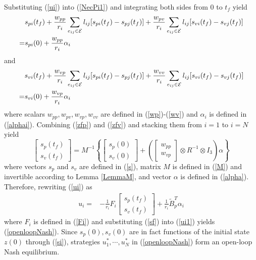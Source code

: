 \documentclass[letterpaper, 10 pt, conference,onecolumn]{ieeeconf}  %
\begin{document}
Substituting (\ref{ui}) into (\ref{NecPi1}) and integrating both sides from $0$ to $t_f$ yield
\begin{align}
&s_{pi}(t_f)+\frac{w_{pp}}{r_i}\sum_{e_{ij}\in\mathcal{E}} l_{ij}[s_{pi}(t_f)-s_{pj}(t_f)] +\frac{w_{pv}}{r_i}\sum_{e_{ij}\in\mathcal{E}} l_{ij}[s_{vi}(t_f)-s_{vj}(t_f)]\notag\\
=&s_{pi}(0)+\frac{w_{pp}}{r_i}\alpha_i
\label{zfp}
\end{align}
and
\begin{align}
&s_{vi}(t_f)+\frac{w_{vp}}{r_i}\sum_{e_{ij}\in\mathcal{E}} l_{ij}[s_{pi}(t_f)-s_{pj}(t_f)] +\frac{w_{vv}}{r_i}\sum_{e_{ij}\in\mathcal{E}} l_{ij}[s_{vi}(t_f)-s_{vj}(t_f)]\notag\\
=&s_{vi}(0)+\frac{w_{vp}}{r_i}\alpha_i
\label{zfv}
\end{align}
where scalars $w_{pp},w_{pv},w_{vp},w_{vv}$ are defined in (\ref{wp})-(\ref{wv}) and $\alpha_i$ is defined in (\ref{alphai}). Combining (\ref{zfp}) and (\ref{zfv}) and stacking them from $i=1$ to $i=N$ yield
\begin{equation}
\begin{bmatrix}
s_p(t_f)\\
s_v(t_f)
\end{bmatrix}=M^{-1}\left\{\begin{bmatrix}
s_p(0)\\
s_v(0)
\end{bmatrix}+\left(\begin{bmatrix}
w_{pp}\\
w_{vp}
\end{bmatrix}\otimes R^{-1}\otimes I_3\right)\alpha\right\}\label{sf}
\end{equation}
where vectors $s_p$ and $s_v$ are defined in (\ref{s}), matrix $M$ is defined in (\ref{M}) and invertible according to Lemma \ref{LemmaM}, and vector $\alpha$ is defined in (\ref{alpha}). Therefore, rewriting (\ref{ui}) as
\begin{align}
u_i=&-\frac{1}{r_i}F_i\begin{bmatrix}
s_p(t_f)\\
s_v(t_f)
\end{bmatrix}+\frac{1}{r_i}\tilde{B}^T_p \alpha_{i}\label{ui1}
\end{align}
where $F_i$ is defined in (\ref{Fi}) and substituting (\ref{sf}) into (\ref{ui1}) yields (\ref{openloopNash}). Since $s_p(0),s_v(0)$ are in fact functions of the initial state $z(0)$ through (\ref{si}), strategies $u^*_1,\cdots,u_N^*$ in (\ref{openloopNash}) form an open-loop Nash equilibrium.
\end{document}
